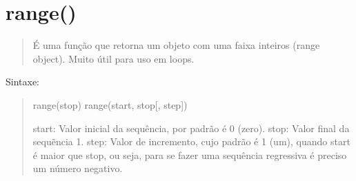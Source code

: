 \documentclass[letterpaper,10pt,brazil]{sphinxmanual}
\begin{document}
\begin{sphinxVerbatim}[commandchars=\\\{\}]
      

\end{sphinxVerbatim}

\begin{sphinxVerbatim}[commandchars=\\\{\}]
\end{sphinxVerbatim}

\begin{sphinxVerbatim}[commandchars=\\\{\}]
\end{sphinxVerbatim}

\begin{sphinxVerbatim}[commandchars=\\\{\}]
\end{sphinxVerbatim}


\section{range()}
\label{\detokenize{content/built-ins:range}}\begin{quote}

É uma função que retorna um objeto com uma faixa inteiros (range object).
Muito útil para uso em loops.
\end{quote}

Sintaxe:
\begin{quote}

range(stop)
range(start, stop{[}, step{]})

start: Valor inicial da sequência, por padrão é 0 (zero).
stop:  Valor final da sequẽncia \sphinxhyphen{} 1.
step:  Valor de incremento, cujo padrão é 1 (um), quando start é maior que stop, ou seja, para se fazer uma sequência regressiva é preciso um número negativo.
\end{quote}
\end{document}
